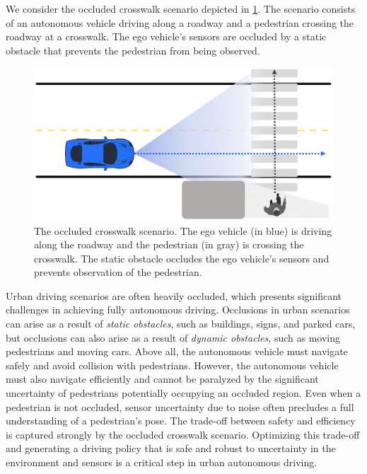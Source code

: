 \documentclass[conference]{IEEEtran}
\begin{document}
We consider the occluded crosswalk scenario depicted in \cref{fig:occluded_crosswalk_scenario}. The scenario consists of an autonomous vehicle driving along a roadway and a pedestrian crossing the roadway at a crosswalk. The ego vehicle's sensors are occluded by a static obstacle that prevents the pedestrian from being observed. 

\begin{figure}[htbp]
    \centerline{\includegraphics[width=0.95\linewidth]{doc/main/occluded_crosswalk_scenario.png}}
    \caption{The occluded crosswalk scenario. The ego vehicle (in blue) is driving along the roadway and the pedestrian (in gray) is crossing the crosswalk. The static obstacle occludes the ego vehicle's sensors and prevents observation of the pedestrian.}
    \label{fig:occluded_crosswalk_scenario}
\end{figure}

Urban driving scenarios are often heavily occluded, which presents significant challenges in achieving fully autonomous driving. Occlusions in urban scenarios can arise as a result of \textit{static obstacles}, such as buildings, signs, and parked cars, but occlusions can also arise as a result of \textit{dynamic obstacles}, such as moving pedestrians and moving cars. Above all, the autonomous vehicle must navigate safely and avoid collision with pedestrians. However, the autonomous vehicle must also navigate efficiently and cannot be paralyzed by the significant uncertainty of pedestrians potentially occupying an occluded region. Even when a pedestrian is not occluded, sensor uncertainty due to noise often precludes a full understanding of a pedestrian's pose. The trade-off between safety and efficiency is captured strongly by the occluded crosswalk scenario. Optimizing this trade-off and generating a driving policy that is safe and robust to uncertainty in the environment and sensors is a critical step in urban autonomous driving.
\end{document}
